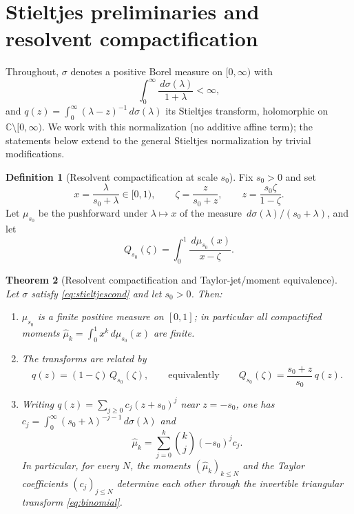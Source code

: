 \documentclass[11pt]{amsart}
\newtheorem{theorem}{Theorem}[section]
\theoremstyle{definition}
\newtheorem{definition}[theorem]{Definition}
\theoremstyle{remark}
\newcommand{\C}{\mathbb{C}}
\newcommand{\dd}{\,d}
\newcommand{\muh}{\widehat{\mu}}
\begin{document}
\section{Stieltjes preliminaries and resolvent compactification}
\label{sec:compact}

Throughout, $\sigma$ denotes a positive Borel measure on $[0,\infty)$ with
\begin{equation}\label{eq:stieltjescond}
\int_0^\infty\frac{\dd\sigma(\lambda)}{1+\lambda}<\infty,
\end{equation}
and $q(z)=\int_0^\infty(\lambda-z)^{-1}\dd\sigma(\lambda)$ its
Stieltjes transform, holomorphic on $\C\setminus[0,\infty)$. We work with
this normalization (no additive affine term); the statements below extend to
the general Stieltjes normalization by trivial modifications.

\begin{definition}[Resolvent compactification at scale $s_0$]
\label{def:compact}
Fix $s_0>0$ and set
\[
x=\frac{\lambda}{s_0+\lambda}\in[0,1),
\qquad
\zeta=\frac{z}{s_0+z},
\qquad
z=\frac{s_0\zeta}{1-\zeta}.
\]
Let $\mu_{s_0}$ be the pushforward under $\lambda\mapsto x$ of the measure
$\dd\sigma(\lambda)/(s_0+\lambda)$, and let
\[
Q_{s_0}(\zeta)=\int_0^1\frac{\dd\mu_{s_0}(x)}{x-\zeta}.
\]
\end{definition}

\begin{theorem}[Resolvent compactification and Taylor-jet/moment equivalence]
\label{thm:compactification}
Let $\sigma$ satisfy \eqref{eq:stieltjescond} and let $s_0>0$. Then:
\begin{enumerate}
\item $\mu_{s_0}$ is a finite positive measure on $[0,1]$; in particular all
compactified moments $\muh_k=\int_0^1 x^k\dd\mu_{s_0}(x)$ are finite.
\item The transforms are related by
\begin{equation}\label{eq:Qtransform}
q(z)=(1-\zeta)\,Q_{s_0}(\zeta),
\qquad\text{equivalently}\qquad
Q_{s_0}(\zeta)=\frac{s_0+z}{s_0}\,q(z).
\end{equation}
\item Writing $q(z)=\sum_{j\ge0}c_j(z+s_0)^j$ near $z=-s_0$, one has
$c_j=\int_0^\infty(s_0+\lambda)^{-j-1}\dd\sigma(\lambda)$ and
\begin{equation}\label{eq:binomial}
\muh_k=\sum_{j=0}^k\binom{k}{j}(-s_0)^j c_j .
\end{equation}
In particular, for every $N$, the moments $(\muh_k)_{k\le N}$ and the Taylor
coefficients $(c_j)_{j\le N}$ determine each other through the invertible
triangular transform \eqref{eq:binomial}.
\end{enumerate}
\end{theorem}
\end{document}
